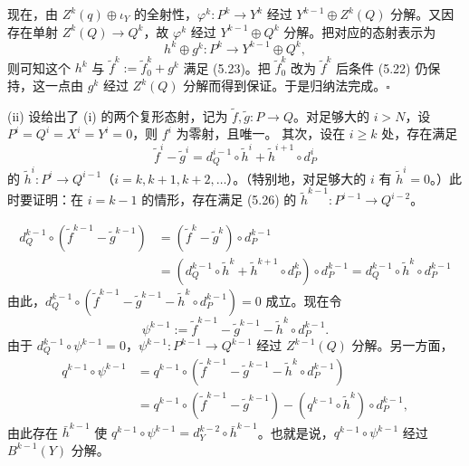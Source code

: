 
现在，由 $Z^k(q)\oplus\iota_Y$ 的全射性，$\varphi^k\colon P^k\to Y^k$ 经过 $Y^{k-1}\oplus Z^k(Q)$ 分解。又因存在单射 $Z^k(Q)\to Q^k$，故 $\varphi^k$ 经过 $Y^{k-1}\oplus Q^k$ 分解。把对应的态射表示为
\[
  h^k\oplus g^k\colon P^k\to Y^{k-1}\oplus Q^k,
\]
则可知这个 $h^k$ 与 $\tilde f^k:=\tilde f_0^k+g^k$ 满足 (5.23)。把 $\tilde f_0^k$ 改为 $\tilde f^k$ 后条件 (5.22) 仍保持，这一点由 $g^k$ 经过 $Z^k(Q)$ 分解而得到保证。于是归纳法完成。\hfill$\square$

(ii) 设给出了 (i) 的两个复形态射，记为 $\tilde f,\tilde g\colon P\to Q$。对足够大的 $i>N$，设 $P^i=Q^i=X^i=Y^i=0$，则 $f^i$ 为零射，且唯一。
其次，设在 $i\ge k$ 处，存在满足
\begin{equation}
  \tilde f^i-\tilde g^i=d_Q^{i-1}\circ\tilde h^i+\tilde h^{i+1}\circ d_P^i \tag{5.26}
\end{equation}
的 $\tilde h^i\colon P^i\to Q^{i-1}$（$i=k,k+1,k+2,\ldots$）。（特别地，对足够大的 $i$ 有 $\tilde h^i=0$。）此时要证明：在 $i=k-1$ 的情形，存在满足 (5.26) 的 $\tilde h^{k-1}\colon P^{i-1}\to Q^{i-2}$。


\begin{align*}
  d_Q^{k-1}\circ(\tilde f^{k-1}-\tilde g^{k-1})
  &= (\tilde f^k-\tilde g^k)\circ d_P^{k-1}\\
  &= (d_Q^{k-1}\circ\tilde h^k+\tilde h^{k+1}\circ d_P^k)\circ d_P^{k-1}
   = d_Q^{k-1}\circ\tilde h^k\circ d_P^{k-1}
\end{align*}
由此，$d_Q^{k-1}\circ(\tilde f^{k-1}-\tilde g^{k-1}-\tilde h^k\circ d_P^{k-1})=0$ 成立。现在令
\[
  \psi^{k-1}:=\tilde f^{k-1}-\tilde g^{k-1}-\tilde h^k\circ d_P^{k-1}.
\]
由于 $d_Q^{k-1}\circ\psi^{k-1}=0$，$\psi^{k-1}\colon P^{k-1}\to Q^{k-1}$ 经过 $Z^{k-1}(Q)$ 分解。另一方面，
\begin{align*}
  q^{k-1}\circ\psi^{k-1}
  &= q^{k-1}\circ(\tilde f^{k-1}-\tilde g^{k-1}-\tilde h^k\circ d_P^{k-1})\\
  &= q^{k-1}\circ(\tilde f^{k-1}-\tilde g^{k-1})-(q^{k-1}\circ\tilde h^k)\circ d_P^{k-1},
\end{align*}
由此存在 $\bar h^{k-1}$ 使 $q^{k-1}\circ\psi^{k-1}=d_Y^{k-2}\circ\bar h^{k-1}$。也就是说，$q^{k-1}\circ\psi^{k-1}$
经过 $B^{k-1}(Y)$ 分解。

